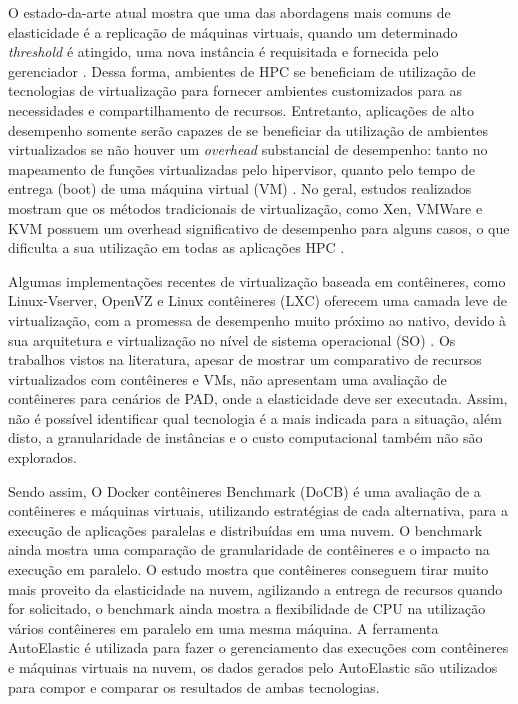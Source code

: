 \documentclass[twoside,english,brazilian]{UNISINOSartigo}
\begin{document}
O estado-da-arte atual mostra que uma das abordagens mais comuns de elasticidade é a replicação de máquinas virtuais, quando um determinado \textit{threshold} é atingido, uma nova instância é requisitada e fornecida pelo gerenciador \cite{7090978,7185168,6217477}. Dessa forma, ambientes de HPC se beneficiam de utilização de tecnologias de virtualização para fornecer ambientes customizados para as necessidades e compartilhamento de recursos. Entretanto, aplicações de alto desempenho somente serão capazes de se beneficiar da utilização de ambientes virtualizados se não houver um \textit{overhead} substancial de desempenho: tanto no mapeamento de funções virtualizadas pelo hipervisor, quanto pelo tempo de entrega (boot) de uma máquina virtual (VM) \cite{Xavier2013}. No geral, estudos realizados mostram que os métodos tradicionais de virtualização, como Xen, VMWare e KVM possuem um overhead significativo de desempenho para alguns casos, o que dificulta a sua utilização em todas as aplicações HPC \cite{Zheng2017}. 

Algumas implementações recentes de virtualização baseada em contêineres, como Linux-Vserver, OpenVZ e Linux contêineres (LXC) oferecem uma camada leve de virtualização, com a promessa de desempenho muito próximo ao nativo, devido à sua arquitetura e virtualização no nível de sistema operacional (SO) \cite{Bernstein2014}. Os trabalhos vistos na literatura, apesar de mostrar um comparativo de recursos virtualizados com contêineres e VMs, não apresentam uma avaliação de contêineres para cenários de PAD, onde a elasticidade deve ser executada. Assim, não é possível identificar qual tecnologia é a mais indicada para a situação, além disto, a granularidade de instâncias e o custo computacional também não são explorados.

Sendo assim, O Docker contêineres Benchmark (DoCB) é uma avaliação de a contêineres e máquinas virtuais, utilizando estratégias de cada alternativa, para a execução de aplicações paralelas e distribuídas em uma nuvem. O benchmark ainda mostra uma comparação de granularidade de contêineres e o impacto na execução em paralelo. O estudo mostra que contêineres conseguem tirar muito mais proveito da elasticidade na nuvem, agilizando a entrega de recursos quando for solicitado, o benchmark ainda mostra a flexibilidade de CPU na utilização vários contêineres em paralelo em uma mesma máquina. A ferramenta AutoElastic é utilizada para fazer o gerenciamento das execuções com contêineres e máquinas virtuais na nuvem, os dados gerados pelo AutoElastic são utilizados para compor e comparar os resultados de ambas tecnologias. 
\end{document}
